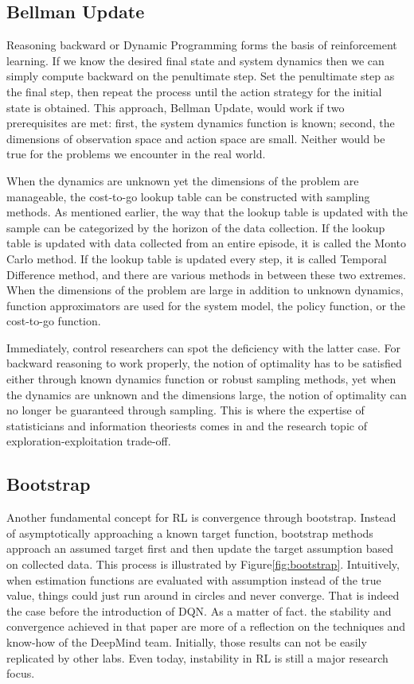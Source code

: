 \documentclass[journal]{IEEEtran}
\begin{document}
\subsection{Bellman Update}

Reasoning backward or Dynamic Programming forms the basis of reinforcement learning. If we know the desired final state and system dynamics then we can simply compute backward on the penultimate step. Set the penultimate step as the final step, then repeat the process until the action strategy for the initial state is obtained. This approach, Bellman Update, would work if two prerequisites are met: first, the system dynamics function is known; second, the dimensions of observation space and action space are small. Neither would be true for the problems we encounter in the real world.

When the dynamics are unknown yet the dimensions of the problem are manageable, the cost-to-go lookup table can be constructed with sampling methods. As mentioned earlier, the way that the lookup table is updated with the sample can be categorized by the horizon of the data collection. If the lookup table is updated with data collected from an entire episode, it is called the Monto Carlo method. If the lookup table is updated every step, it is called Temporal Difference method, and there are various methods in between these two extremes. When the dimensions of the problem are large in addition to unknown dynamics, function approximators are used for the system model, the policy function, or the cost-to-go function. 

Immediately, control researchers can spot the deficiency with the latter case. For backward reasoning to work properly, the notion of optimality has to be satisfied either through known dynamics function or robust sampling methods, yet when the dynamics are unknown and the dimensions large, the notion of optimality can no longer be guaranteed through sampling. This is where the expertise of statisticians and information theoriests comes in and the research topic of exploration-exploitation trade-off.

\subsection{Bootstrap}

Another fundamental concept for RL is convergence through bootstrap. Instead of asymptotically approaching a known target function, bootstrap methods approach an assumed target first and then update the target assumption based on collected data. This process is illustrated by Figure\ref{fig:bootstrap}. Intuitively, when estimation functions are evaluated with assumption instead of the true value, things could just run around in circles and never converge. That is indeed the case before the introduction of DQN\cite{Osband2016DeepEV}. As a matter of fact. the stability and convergence achieved in that paper are more of a reflection on the techniques and know-how of the DeepMind team. Initially, those results can not be easily replicated by other labs. Even today, instability in RL is still a major research focus. 
\end{document}
